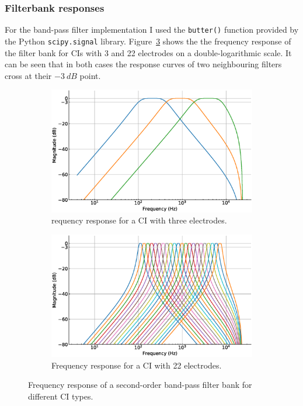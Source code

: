 \documentclass{scrartcl}			%
\begin{document}
\subsubsection{Filterbank responses}
For the band-pass filter implementation I used the \texttt{butter()} function provided by the Python \texttt{scipy.signal} library.
Figure~\ref{fig:freq_resp} shows the the frequency response of the filter bank for CIs with 3 and 22 electrodes on a double-logarithmic scale. It can be seen that in both cases the response curves of two neighbouring filters cross at their  $\SI{-3}{dB}$ point.

\begin{figure}[H]
  \begin{subfigure}[b]{\linewidth}
    \centering
	\includegraphics[width=0.9\linewidth]{imgs/ci_with_3_electrodes.eps}
    \caption{requency response for a CI with three electrodes.} 
    \label{fig:ci_3} 
    \end{subfigure}
    \quad
      \begin{subfigure}[b]{\linewidth}
   	 \centering
   	 \includegraphics[width=0.9\linewidth]{imgs/ci_with_22_electrodes.eps}
    \caption{Frequency response for a CI with 22 electrodes.} 
    \label{fig:ci_22} 
    \end{subfigure}
    \caption{Frequency response of a second-order  band-pass filter bank for different CI types.}
    \label{fig:freq_resp}
\end{figure}
\end{document}
